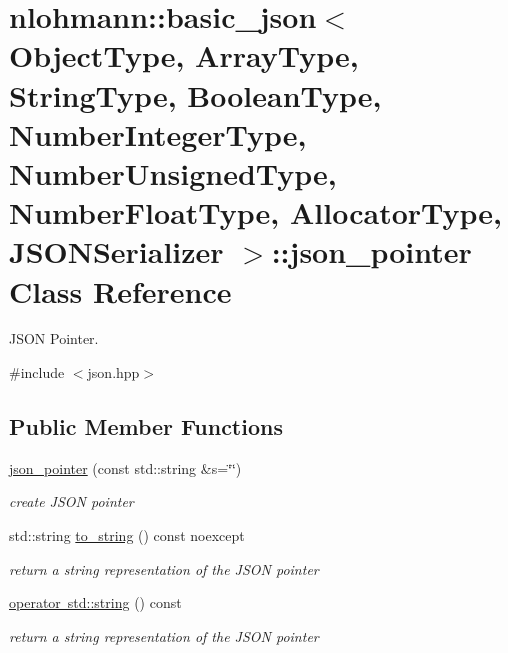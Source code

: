 \hypertarget{classnlohmann_1_1basic__json_1_1json__pointer}{}\section{nlohmann\+::basic\+\_\+json$<$ Object\+Type, Array\+Type, String\+Type, Boolean\+Type, Number\+Integer\+Type, Number\+Unsigned\+Type, Number\+Float\+Type, Allocator\+Type, J\+S\+O\+N\+Serializer $>$\+::json\+\_\+pointer Class Reference}
\label{classnlohmann_1_1basic__json_1_1json__pointer}


J\+S\+ON Pointer.  




{\ttfamily \#include $<$json.\+hpp$>$}

\subsection*{Public Member Functions}
\begin{DoxyCompactItemize}
\item 
\mbox{\hyperlink{classnlohmann_1_1basic__json_1_1json__pointer_abaa66b0d30811b8a8670a673c686b75a}{json\+\_\+pointer}} (const std\+::string \&s=\char`\"{}\char`\"{})
\begin{DoxyCompactList}\small\item\em create J\+S\+ON pointer \end{DoxyCompactList}\item 
std\+::string \mbox{\hyperlink{classnlohmann_1_1basic__json_1_1json__pointer_adf63cdde9493796d8aa61bd948984b6d}{to\+\_\+string}} () const noexcept
\begin{DoxyCompactList}\small\item\em return a string representation of the J\+S\+ON pointer \end{DoxyCompactList}\item 
\mbox{\hyperlink{classnlohmann_1_1basic__json_1_1json__pointer_aa2583b66886218c1a035e3e507a5f931}{operator std\+::string}} () const
\begin{DoxyCompactList}\small\item\em return a string representation of the J\+S\+ON pointer \end{DoxyCompactList}\end{DoxyCompactItemize}
